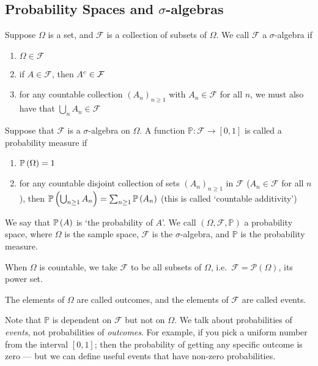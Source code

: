 \subsection{Probability Spaces and \(\sigma\)-algebras}
\begin{definition}
	Suppose \(\Omega\) is a set, and \(\mathcal F\) is a collection of subsets of \(\Omega\).
	We call \(\mathcal F\) a \(\sigma\)-algebra if
	\begin{enumerate}
		\item \(\Omega \in \mathcal F\)
		\item if \(A \in \mathcal F\), then \({A}^c \in \mathcal F\)
		\item for any countable collection \((A_n)_{n \geq 1}\) with \(A_n \in \mathcal F\) for all \(n\), we must also have that \(\bigcup_n A_n \in \mathcal F\)
	\end{enumerate}
\end{definition}
\begin{definition}
	Suppose that \(\mathcal F\) is a \(\sigma\)-algebra on \(\Omega\).
	A function \(\mathbb P \colon \mathcal F \to [0, 1]\) is called a probability measure if
	\begin{enumerate}
		\item \(\mathbb{P}\left({\Omega}\right) = 1\)
		\item for any countable disjoint collection of sets \((A_n)_{n \geq 1}\) in \(\mathcal F\) (\(A_n \in \mathcal F\) for all \(n\)), then \(\mathbb{P}\left({\bigcup_{n \geq 1}A_n}\right) = \sum_{n \geq 1} \mathbb{P}\left({A_n}\right)\) (this is called `countable additivity')
	\end{enumerate}
	We say that \(\mathbb{P}\left({A}\right)\) is `the probability of \(A\)'.
	We call \((\Omega, \mathcal F, \mathbb P)\) a probability space, where \(\Omega\) is the sample space, \(\mathcal F\) is the \(\sigma\)-algebra, and \(\mathbb P\) is the probability measure.
\end{definition}

\begin{remark}
	When \(\Omega\) is countable, we take \(\mathcal F\) to be all subsets of \(\Omega\), i.e.\ \(\mathcal F = \mathcal P(\Omega)\), its power set.
\end{remark}
\begin{definition}
	The elements of \(\Omega\) are called outcomes, and the elements of \(\mathcal F\) are called events.
\end{definition}
Note that \(\mathbb P\) is dependent on \(\mathcal F\) but not on \(\Omega\).
We talk about probabilities of \textit{events}, not probabilities of \textit{outcomes}.
For example, if you pick a uniform number from the interval \([0, 1]\); then the probability of getting any specific outcome is zero --- but we can define useful events that have non-zero probabilities.

